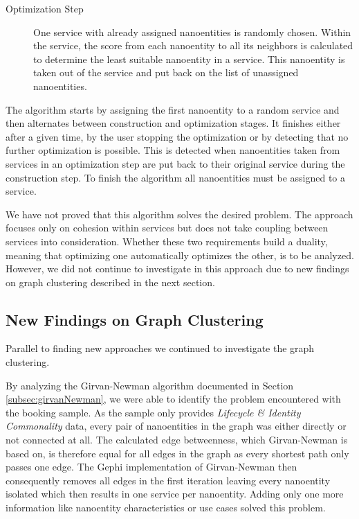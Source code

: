 \begin{description}
\item[Optimization Step] One service with already assigned nanoentities is randomly chosen. Within the service, the score from each nanoentity to all its neighbors is calculated to determine the least suitable nanoentity in a service. This nanoentity is taken out of the service and put back on the list of unassigned nanoentities.
\end{description}


The algorithm starts by assigning the first nanoentity to a random service and then alternates between construction and optimization stages. It finishes either after a given time, by the user stopping the optimization or by detecting that no further optimization is possible. This is detected when nanoentities taken from services in an optimization step are put back to their original service during the construction step. To finish the algorithm all nanoentities must be assigned to a service.

We have not proved that this algorithm solves the desired problem. The approach focuses only on cohesion within services but does not take coupling between services into consideration. Whether these two requirements build a duality, meaning that optimizing one automatically optimizes the other, is to be analyzed. However, we did not continue to investigate in this approach due to new findings on graph clustering described in the next section.

\subsection{New Findings on Graph Clustering}

Parallel to finding new approaches we continued to investigate the graph clustering.

By analyzing the Girvan-Newman algorithm documented in Section \ref{subsec:girvanNewman}, we were able to identify the problem encountered with the booking sample. As the sample only provides \textit{Lifecycle \& Identity Commonality} data, every pair of nanoentities in the graph was either directly or not connected at all. The calculated edge betweenness, which Girvan-Newman is based on, is therefore equal for all edges in the graph as every shortest path only passes one edge. The Gephi\cite{gephi} implementation of Girvan-Newman then consequently removes all edges in the first iteration leaving every nanoentity isolated which then results in one service per nanoentity. Adding only one more information like nanoentity characteristics or use cases solved this problem.

